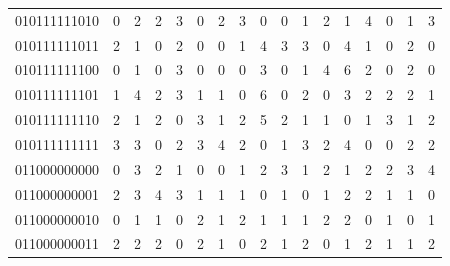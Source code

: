 \documentclass[10pt,a4paper]{article}
\begin{document}
\begin{longtable}{ |c|c|c|c|c|c|c|c|c|c|c|c|c|c|c|c|c| }
    010111111010              & 0                            & 2                                & 2                            & 3                              & 0   & 2   & 3   & 0   & 0   & 1   & 2   & 1   & 4   & 0   & 1   & 3   \\
    010111111011              & 2                            & 1                                & 0                            & 2                              & 0   & 0   & 1   & 4   & 3   & 3   & 0   & 4   & 1   & 0   & 2   & 0   \\
    010111111100              & 0                            & 1                                & 0                            & 3                              & 0   & 0   & 0   & 3   & 0   & 1   & 4   & 6   & 2   & 0   & 2   & 0   \\
    010111111101              & 1                            & 4                                & 2                            & 3                              & 1   & 1   & 0   & 6   & 0   & 2   & 0   & 3   & 2   & 2   & 2   & 1   \\
    010111111110              & 2                            & 1                                & 2                            & 0                              & 3   & 1   & 2   & 5   & 2   & 1   & 1   & 0   & 1   & 3   & 1   & 2   \\
    010111111111              & 3                            & 3                                & 0                            & 2                              & 3   & 4   & 2   & 0   & 1   & 3   & 2   & 4   & 0   & 0   & 2   & 2   \\
    011000000000              & 0                            & 3                                & 2                            & 1                              & 0   & 0   & 1   & 2   & 3   & 1   & 2   & 1   & 2   & 2   & 3   & 4   \\
    011000000001              & 2                            & 3                                & 4                            & 3                              & 1   & 1   & 1   & 0   & 1   & 0   & 1   & 2   & 2   & 1   & 1   & 0   \\
    011000000010              & 0                            & 1                                & 1                            & 0                              & 2   & 1   & 2   & 1   & 1   & 1   & 2   & 2   & 0   & 1   & 0   & 1   \\
    011000000011              & 2                            & 2                                & 2                            & 0                              & 2   & 1   & 0   & 2   & 1   & 2   & 0   & 1   & 2   & 1   & 1   & 2   \\

\end{longtable}
\end{document}
